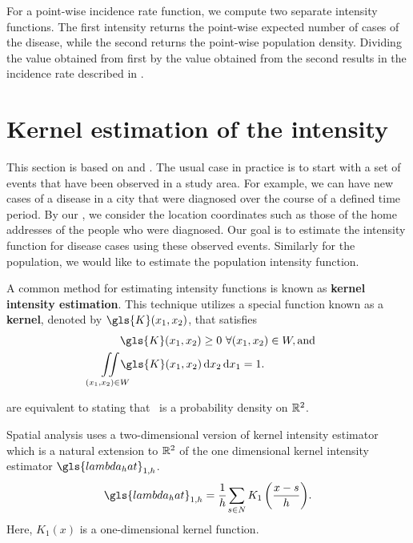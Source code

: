 For a point-wise \gls{incidence rate} function,
we compute two separate \gls{intensity} functions.
The first \gls{intensity} returns the point-wise expected number of cases of the disease,
while the second returns the point-wise population density.
Dividing the value obtained from first by the value obtained from the second results in the \gls{incidence rate} described in .

\section{Kernel estimation of the intensity}
\label{sec:theory:kernelestimation}

This section is based on \citet{silverman1986density} and \citet{wand1994kernel}.
The usual case in practice is to start with a set of \glspl{event} that have been observed in a study area.
For example, we can have new cases of a disease in a city that were diagnosed over the course of a defined time period.
By our ,
we consider the location coordinates such as those of the home addresses of the people who were diagnosed.
Our goal is to estimate the \gls{intensity} function for disease cases using these observed \glspl{event}.
Similarly for the population,
we would like to estimate the population \gls{intensity} function.

A common method for estimating \gls{intensity} functions is known as
\textbf{\gls{kernel intensity estimation}}.
This technique utilizes a special function known as a \textbf{\gls{kernel}},
denoted by $\gls{K}\xvec$,
that satisfies
\begin{align}
    & \hspace{1.75em} \gls{K}\xvec \ge 0~ \forall \xvec \in W, \text{and} \label{eq:k_pos} \\%
    & \iintW{\gls{K}\xvec} = 1 \text{.} \label{eq:k_1}%
\end{align}

 are equivalent to stating that \Kdots~is a probability density on $\mathbb{R}^2$.

Spatial analysis uses a two-dimensional version of \gls{kernel intensity estimator}
which is a natural extension to $\mathbb{R}^2$ of the one dimensional \gls{kernel intensity estimator} $\gls{lambda_hat}_{1,h}$.
\begin{equation}
    \label{eq:lambda_hat_1}
    \gls{lambda_hat}_{1,h} = \sumSone{K_1\left( \frac{x - s}{h} \right)} \text{.}%
\end{equation}
Here, $K_1(x)$ is a one-dimensional kernel function.

